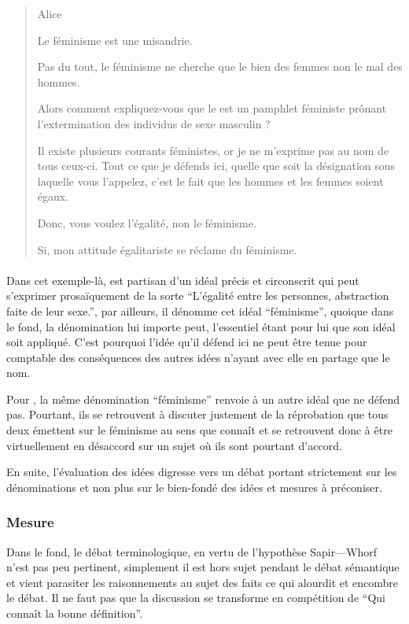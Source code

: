 \begin{quote}
  \begin{drama}{0cm}{0cm}{Alice}

    \Aspeaks Le féminisme est une misandrie.

    \Bspeaks Pas du tout, le féminisme ne cherche que le bien des femmes non le mal des hommes.

    \Aspeaks Alors comment expliquez-vous que le  est un pamphlet féministe prônant l’extermination des individus de sexe masculin ?

    \Bspeaks Il existe plusieurs courants féministes, or je ne m’exprime pas au nom de tous ceux-ci. Tout ce que je défends ici, quelle que soit la désignation sous laquelle vous l’appelez, c’est le fait que les hommes et les femmes soient égaux.

    \Aspeaks Donc, vous voulez l’égalité, non le féminisme.

    \Bspeaks Si, mon attitude égalitariste se réclame du féminisme.

  \end{drama}
\end{quote}

\paragraph{}
Dans cet exemple-là, \B est partisan d’un idéal précis et circonscrit qui peut s’exprimer prosaïquement de la sorte \enquote{L’égalité entre les personnes, abstraction faite de leur sexe.}, par ailleurs, il dénomme cet idéal \enquote{féminisme}, quoique dans le fond, la dénomination lui importe peut, l’essentiel étant pour lui que son idéal soit appliqué.
C’est pourquoi l’idée qu’il défend ici ne peut être tenue pour comptable des conséquences des autres idées n’ayant avec elle en partage que le nom.

Pour \A, la même dénomination \enquote{féminisme} renvoie à un autre idéal que \B ne défend pas. Pourtant, ils se retrouvent à discuter justement de la réprobation que tous deux émettent sur le féminisme au sens que connaît \A et se retrouvent donc à être virtuellement en désaccord sur un sujet où ils sont pourtant d’accord.

En suite, l’évaluation des idées digresse vers un débat portant strictement sur les dénominations et non plus sur le bien-fondé des idées et mesures à préconiser.


\subsubsection{Mesure}
Dans le fond, le débat terminologique, en vertu de l’hypothèse Sapir—Whorf n’est pas peu pertinent, simplement il est hors sujet pendant le débat sémantique et vient parasiter les raisonnements au sujet des faits ce qui alourdit et encombre le débat. Il ne faut pas que la discussion se transforme en compétition de \enquote{Qui connaît la bonne définition}.

